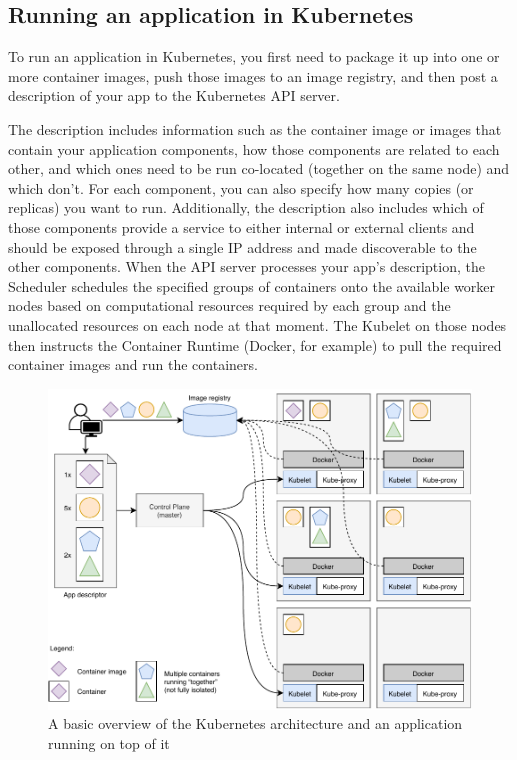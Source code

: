 \subsection{Running an application in Kubernetes}
To run an application in Kubernetes, you first need to package it up into one or more container images, push those images to an image registry, and then post a description of your app to the Kubernetes API server.

The description includes information such as the container image or images that contain your application components, how those components are related to each other, and which ones need to be run co-located (together on the same node) and which don’t. For each component, you can also specify how many copies (or replicas) you want to run. Additionally, the description also includes which of those components provide a service to either internal or external clients and should be exposed through a single IP address and made discoverable to the other components.
When the API server processes your app’s description, the Scheduler schedules the specified groups of containers onto the available worker nodes based on computational resources required by each group and the unallocated resources on each node at that moment. The Kubelet on those nodes then instructs the Container Runtime (Docker, for example) to pull the required container images and run the containers.

\begin{figure}[htbp]
	\centering
	\includegraphics[width=\textwidth]{images/kubedockeroverview.pdf}
	\caption{A basic overview of the Kubernetes architecture and an application running on top of it}
	\label{fig:kubedockeroverview}
\end{figure}

